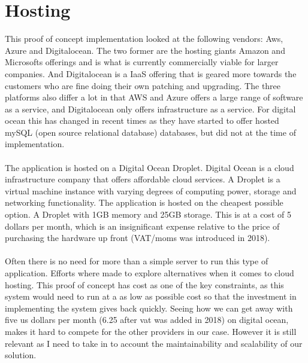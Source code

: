 \documentclass[]{uiophd}
\begin{document}
\section{Hosting}
This proof of concept implementation looked at the following vendors: Aws, Azure and Digitalocean. The two former are the hosting giants Amazon and Microsofts offerings and is what is currently commercially viable for larger companies. And Digitalocean is a IaaS offering that is geared more towards the customers who are fine doing their own patching and upgrading. The three platforms also differ a lot in that AWS and Azure offers a large range of software as a service, and Digitalocean only offers infrastructure as a service. For digital ocean this has changed in recent times as they have started to offer hosted mySQL (open source relational database) databases, but did not at the time of implementation.
\\\\
The application is hosted on a Digital Ocean Droplet. Digital Ocean is a cloud infrastructure company that offers affordable cloud services. A Droplet is a virtual machine instance with varying degrees of computing power, storage and networking functionality. The application is hosted on the cheapest possible option. A Droplet with 1GB memory and 25GB storage. This is at a cost of 5 dollars per month, which is an insignificant expense relative to the price of purchasing the hardware up front (VAT/moms was introduced in 2018).  
\\\\
Often there is no need for more than a simple server to run this type of application. Efforts where made to explore alternatives when it comes to cloud hosting. This proof of concept has cost as one of the key constraints, as this system would need to run at a as low as possible cost so that the investment in implementing the system gives back quickly. Seeing how we can get away with five us dollars per month (6.25 after vat was added in 2018) on digital ocean, makes it hard to compete for the other providers in our case. However it is still relevant as I need to take in to account the maintainability and scalability of our solution.
\end{document}
